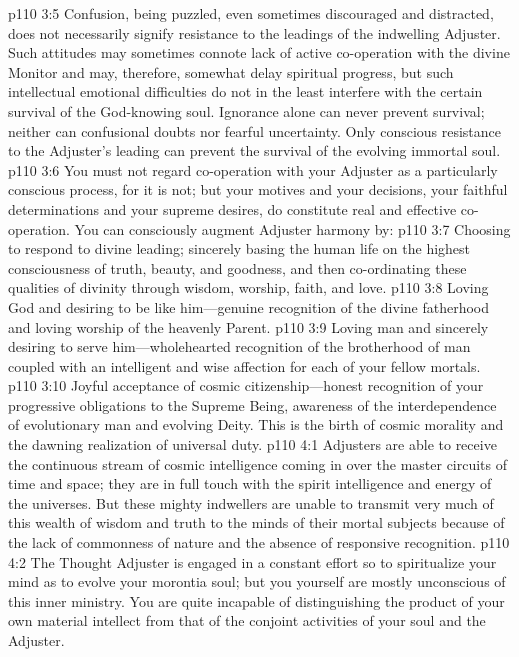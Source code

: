 \pc \vs p110 3:5 Confusion, being puzzled, even sometimes discouraged and distracted, does not necessarily signify resistance to the leadings of the indwelling Adjuster. Such attitudes may sometimes connote lack of active co\hyp{}operation with the divine Monitor and may, therefore, somewhat delay spiritual progress, but such intellectual emotional difficulties do not in the least interfere with the certain survival of the God\hyp{}knowing soul. Ignorance alone can never prevent survival; neither can confusional doubts nor fearful uncertainty. Only conscious resistance to the Adjuster’s leading can prevent the survival of the evolving immortal soul.
\vs p110 3:6 You must not regard co\hyp{}operation with your Adjuster as a particularly conscious process, for it is not; but your motives and your decisions, your faithful determinations and your supreme desires, do constitute real and effective co\hyp{}operation. You can consciously augment Adjuster harmony by:\plusone
\pc \vs p110 3:7 \bibnobreakspace Choosing to respond to divine leading; sincerely basing the human life on the highest consciousness of truth, beauty, and goodness, and then co\hyp{}ordinating these qualities of divinity through wisdom, worship, faith, and love.
\pc \vs p110 3:8 \bibnobreakspace Loving God and desiring to be like him---genuine recognition of the divine fatherhood and loving worship of the heavenly Parent.
\pc \vs p110 3:9 \bibnobreakspace Loving man and sincerely desiring to serve him---wholehearted recognition of the brotherhood of man coupled with an intelligent and wise affection for each of your fellow mortals.
\pc \vs p110 3:10 \bibnobreakspace Joyful acceptance of cosmic citizen\-ship---honest recognition of your progressive obligations to the Supreme Being, awareness of the interdependence of evolutionary man and evolving Deity. This is the birth of cosmic morality and the dawning realization of universal duty.
\vs p110 4:1 Adjusters are able to receive the continuous stream of cosmic intelligence coming in over the master circuits of time and space; they are in full touch with the spirit intelligence and energy of the universes. But these mighty indwellers are unable to transmit very much of this wealth of wisdom and truth to the minds of their mortal subjects because of the lack of commonness of nature and the absence of responsive recognition.
\vs p110 4:2 The Thought Adjuster is engaged in a constant effort so to spiritualize your mind as to evolve your morontia soul; but you yourself are mostly unconscious of this inner ministry. You are quite incapable of distinguishing the product of your own material intellect from that of the conjoint activities of your soul and the Adjuster.
